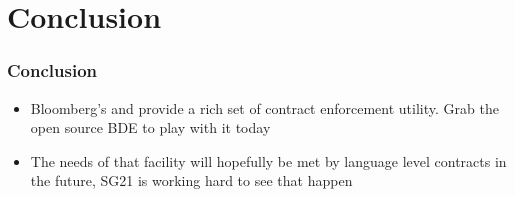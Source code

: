 \section{Conclusion}
\begin{frame}
\end{frame}

\begin{frame}
  \frametitle{Conclusion}
  \begin{itemize}
  \item Bloomberg's  and  provide a rich set of
    contract enforcement utility.  Grab the open source BDE to play with it today
  \item The needs of that facility will hopefully be met by language level contracts
    in the future, SG21 is working hard to see that happen
  \end{itemize}
\end{frame}

